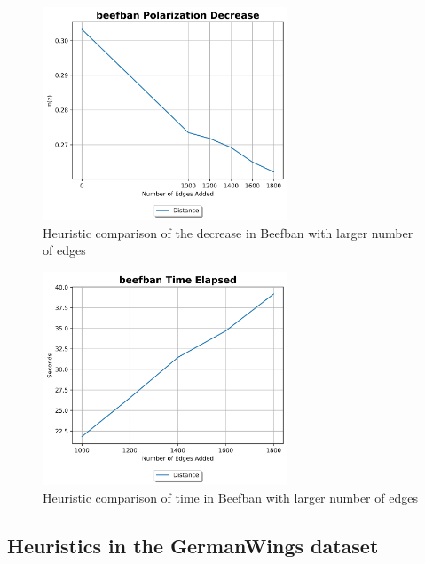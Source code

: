 \begin{table}[H]
\clearpage

\begin{figure}[H]
	\centering
	\includegraphics[width=0.65\textwidth]{Figures/beefban Polarization Decrease 2}
	\caption{Heuristic comparison of the decrease in Beefban with larger number of edges}
	\label{fig:beefban2_pol}
\end{figure}


\begin{figure}[H]
	\centering
	\includegraphics[width=0.65\textwidth]{Figures/beefban Time Elapsed 2}
	\caption{Heuristic comparison of time in Beefban with larger number of edges}
	\label{fig:beefban2_time}
\end{figure}

\clearpage



\subsection{Heuristics in the GermanWings dataset}


\end{table}
